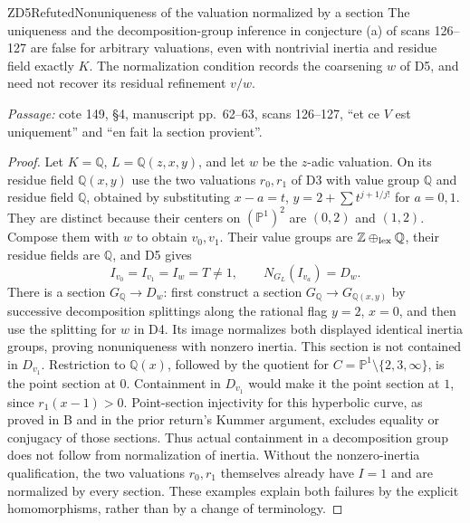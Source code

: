 \begin{result}{ZD5}{Refuted}{Nonuniqueness of the valuation normalized by a section}
The uniqueness and the decomposition-group inference in conjecture (a) of scans 126--127 are false for arbitrary valuations, even with nontrivial inertia and residue field exactly $K$. The normalization condition records the coarsening $w$ of D5, and need not recover its residual refinement $v/w$.
\par\emph{Passage:} cote 149, \S4, manuscript pp.~62--63, scans 126--127, ``et ce $V$ est uniquement'' and ``en fait la section provient''.
\end{result}
\begin{proof}
Let $K=\mathbb Q$, $L=\mathbb Q(z,x,y)$, and let $w$ be the $z$-adic valuation. On its residue field $\mathbb Q(x,y)$ use the two valuations $r_0,r_1$ of D3 with value group $\mathbb Q$ and residue field $\mathbb Q$, obtained by substituting $x-a=t$, $y=2+\sum t^{j+1/j!}$ for $a=0,1$. They are distinct because their centers on $(\mathbb P^1)^2$ are $(0,2)$ and $(1,2)$. Compose them with $w$ to obtain $v_0,v_1$. Their value groups are $\mathbb Z\oplus_{\rm lex}\mathbb Q$, their residue fields are $\mathbb Q$, and D5 gives
\[
 I_{v_0}=I_{v_1}=I_w=T\ne1,\qquad N_{G_L}(I_{v_a})=D_w.
\]
There is a section $G_{\mathbb Q}\to D_w$: first construct a section $G_{\mathbb Q}\to G_{\mathbb Q(x,y)}$ by successive decomposition splittings along the rational flag $y=2$, $x=0$, and then use the splitting for $w$ in D4. Its image normalizes both displayed identical inertia groups, proving nonuniqueness with nonzero inertia.
This section is not contained in $D_{v_1}$. Restriction to $\mathbb Q(x)$, followed by the quotient for $C=\mathbb P^1\setminus\{2,3,\infty\}$, is the point section at $0$. Containment in $D_{v_1}$ would make it the point section at $1$, since $r_1(x-1)>0$. Point-section injectivity for this hyperbolic curve, as proved in B and in the prior return's Kummer argument, excludes equality or conjugacy of those sections. Thus actual containment in a decomposition group does not follow from normalization of inertia. Without the nonzero-inertia qualification, the two valuations $r_0,r_1$ themselves already have $I=1$ and are normalized by every section. These examples explain both failures by the explicit homomorphisms, rather than by a change of terminology.
\end{proof}

